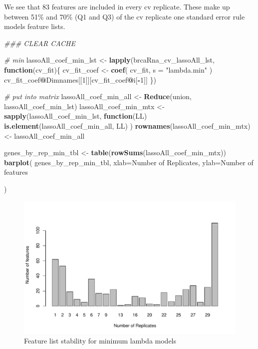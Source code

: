 \documentclass[
]{book}
\newenvironment{Shaded}{\begin{snugshade}}{\end{snugshade}}
\newcommand{\CommentTok}[1]{\textcolor[rgb]{0.56,0.35,0.01}{\textit{#1}}}
\newcommand{\ControlFlowTok}[1]{\textcolor[rgb]{0.13,0.29,0.53}{\textbf{#1}}}
\newcommand{\DataTypeTok}[1]{\textcolor[rgb]{0.13,0.29,0.53}{#1}}
\newcommand{\DecValTok}[1]{\textcolor[rgb]{0.00,0.00,0.81}{#1}}
\newcommand{\KeywordTok}[1]{\textcolor[rgb]{0.13,0.29,0.53}{\textbf{#1}}}
\newcommand{\NormalTok}[1]{#1}
\newcommand{\OperatorTok}[1]{\textcolor[rgb]{0.81,0.36,0.00}{\textbf{#1}}}
\newcommand{\StringTok}[1]{\textcolor[rgb]{0.31,0.60,0.02}{#1}}
\begin{document}
We see that 83 features are included in every
cv replicate. These make up between
51\%
and
70\%
(Q1 and Q3) of the cv replicate one standard error rule models feature lists.

\begin{Shaded}
\begin{Highlighting}[]
\CommentTok{\#\#\# CLEAR CACHE}


\CommentTok{\# min}
\NormalTok{lassoAll\_coef\_min\_lst <{-}}\StringTok{ }\KeywordTok{lapply}\NormalTok{(brcaRna\_cv\_lassoAll\_lst, }\ControlFlowTok{function}\NormalTok{(cv\_fit)\{}
\NormalTok{ cv\_fit\_coef <{-}}\StringTok{ }\KeywordTok{coef}\NormalTok{(}
\NormalTok{ cv\_fit,}
 \DataTypeTok{s =} \StringTok{"lambda.min"}
\NormalTok{ )}
\NormalTok{ cv\_fit\_coef}\OperatorTok{@}\NormalTok{Dimnames[[}\DecValTok{1}\NormalTok{]][cv\_fit\_coef}\OperatorTok{@}\NormalTok{i[}\OperatorTok{{-}}\DecValTok{1}\NormalTok{]]}
\NormalTok{ \})}

\CommentTok{\# put into matrix}
\NormalTok{lassoAll\_coef\_min\_all <{-}}\StringTok{ }\KeywordTok{Reduce}\NormalTok{(union, lassoAll\_coef\_min\_lst)}
\NormalTok{lassoAll\_coef\_min\_mtx <{-}}\StringTok{ }\KeywordTok{sapply}\NormalTok{(lassoAll\_coef\_min\_lst, }
  \ControlFlowTok{function}\NormalTok{(LL) }\KeywordTok{is.element}\NormalTok{(lassoAll\_coef\_min\_all, LL)}
\NormalTok{)}
\KeywordTok{rownames}\NormalTok{(lassoAll\_coef\_min\_mtx) <{-}}\StringTok{ }\NormalTok{lassoAll\_coef\_min\_all}

\NormalTok{genes\_by\_rep\_min\_tbl <{-}}\StringTok{ }\KeywordTok{table}\NormalTok{(}\KeywordTok{rowSums}\NormalTok{(lassoAll\_coef\_min\_mtx))}
\KeywordTok{barplot}\NormalTok{(}
\NormalTok{ genes\_by\_rep\_min\_tbl,}
 \DataTypeTok{xlab=}\StringTok{\textquotesingle{}Number of Replicates\textquotesingle{}}\NormalTok{,}
 \DataTypeTok{ylab=}\StringTok{\textquotesingle{}Number of features\textquotesingle{}}

\NormalTok{)}
\end{Highlighting}
\end{Shaded}

\begin{figure}
\centering
\includegraphics{Static/figures/brca-rnaseq-feature-list-min-1.pdf}
\caption{\label{fig:brca-rnaseq-feature-list-min}Feature list stability for minimum lambda models}
\end{figure}
\end{document}
